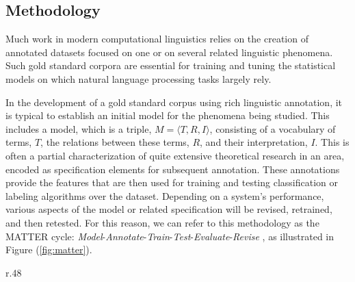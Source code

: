 \documentclass[10pt]{article}
\begin{document}

\vspace {-3mm}


\subsection{Methodology\label{prelim}}
\vspace {-3mm}

Much work in modern computational linguistics relies on the creation of annotated datasets focused on one or on several related linguistic phenomena. Such gold standard corpora are essential for training and tuning the statistical models on which natural language processing tasks largely rely.

In the development of a gold standard corpus using rich linguistic annotation, it is typical to establish an initial model for the phenomena being studied. This includes a model, which is a triple, $M = \langle T,R,I \rangle$, consisting of a vocabulary of terms, $T$, the relations between these terms, $R$, and their interpretation,
$I$. This is often a partial characterization of quite extensive theoretical research in an area, encoded as specification elements for subsequent annotation. These annotations provide the features that are then used for training and testing classification or labeling algorithms over the dataset. Depending on a system's performance, various aspects of the model or related specification will be revised, retrained, and then retested. 
For this reason, we can refer to this methodology as the MATTER cycle: {\it Model}-{\it Annotate}-{\it Train}-{\it Test}-{\it Evaluate}-{\it Revise} \cite{pustejovsky2012natural}, as illustrated in Figure (\ref{fig:matter}). 

\begin{wrapfigure}{r}{.48\textwidth}
\vspace {-9mm}

\centering
{}
\vspace {-4mm}
\caption{The \textsc{matter} Methodology}
\label{fig:matter}

\vspace {-2mm}

\end{wrapfigure}
\end{document}
